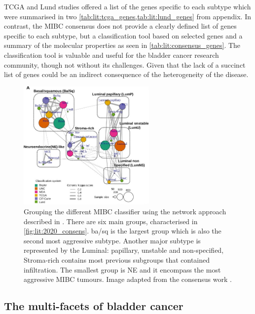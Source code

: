 TCGA and Lund studies offered a list of the genes specific to each subtype which were summarised in two \cref{tab:lit:tcga_genes,tab:lit:lund_genes} from appendix. In contrast, the MIBC consensus does not provide a clearly defined list of genes specific to each subtype, but a classification tool based on selected genes and a summary of the molecular properties as seen in \cref{tab:lit:consensus_genes}. The classification tool is valuable and useful for the bladder cancer research community, though not without its challenges. Given that the lack of a succinct list of genes could be an indirect consequence of the heterogeneity of the disease.


\begin{figure}[!htb]    
    \centering
\includegraphics[width=0.6\textwidth,height=0.6\textheight,keepaspectratio]{Sections/Lit_review/Resources/consensus_network_classifier.jpg}
    \caption[Network of the datasets involved in the MIBC consensus]{Grouping the different MIBC classifier using the network approach described in \cite{Guinney2015-fy}. There are six main groups, characterised in \cref{fig:lit:2020_consens}. \acrfull{ba/sq} is the largest group which is also the second most aggressive subtype. Another major subtype is represented by the Luminal: papillary, unstable and non-specified, Stroma-rich contains most previous subgroups that contained infiltration. The smallest group is \gls{NE} and it encompass the most aggressive MIBC tumours. Image adapted from the consensus work \citet{Kamoun2020-tj}.}
    \label{fig:lit:consensus_network}
\end{figure}




\subsection{The multi-facets of bladder cancer} \label{s:lit:bladder_other}

